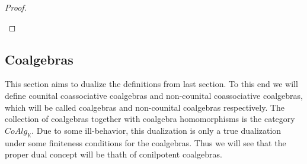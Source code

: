 \documentclass[../thesis.tex]{subfiles}
\begin{document}
\begin{proof}
\begin{center}
                \end{center}
            \end{proof}
            
    \subsection{Coalgebras}
            This section aims to dualize the definitions from last section. To this end we will define counital coassociative coalgebras and non-counital coassociative coalgebras, which will be called coalgebras and non-counital coalgebras respectively. The collection of coalgebras together with coalgebra homomorphisms is the category $CoAlg_{\mathbb{K}}$. Due to some ill-behavior, this dualization is only a true dualization under some finiteness conditions for the coalgebras. Thus we will see that the proper dual concept will be thath of conilpotent coalgebras.
\end{document}
